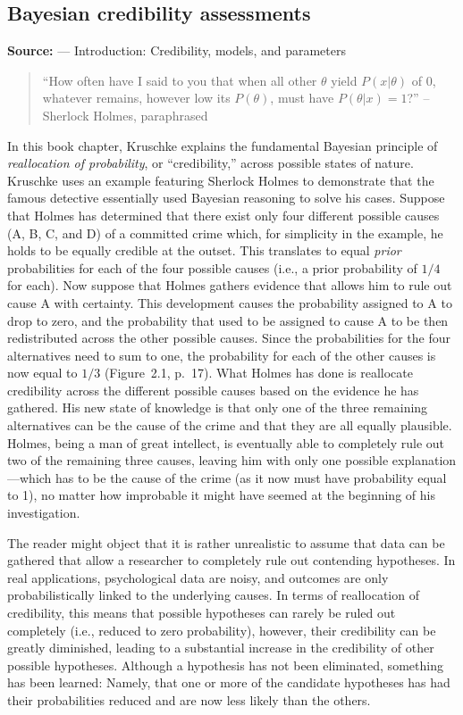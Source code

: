 \subsection{Bayesian credibility assessments}
\noindent\textbf{Source:}  --- Introduction: Credibility, models, and parameters

\vspace{2mm}
\begin{quote}
``How often have I said to you that when all other $\theta$ yield $P(x|\theta)$ of $0$, whatever remains, however low its $P(\theta)$, must have $P(\theta|x) = 1$?''
\flushright -- Sherlock Holmes, paraphrased
\end{quote} 
In this book chapter, Kruschke explains the fundamental Bayesian principle of \emph{reallocation of probability}, or ``credibility,'' across possible states of nature. Kruschke uses an example featuring Sherlock Holmes to demonstrate that the famous detective essentially used Bayesian reasoning to solve his cases.
Suppose that Holmes has determined that there exist only four different possible causes (A, B, C, and D) of a committed crime which, for simplicity in the example, he holds to be equally credible at the outset.
This translates to equal \textit{prior} probabilities for each of the four possible causes (i.e., a prior probability of $1/4$ for each).
Now suppose that Holmes gathers evidence that allows him to rule out cause A with certainty.  This development causes the probability assigned to A to drop to zero, and the probability that used to be assigned to cause A to be then redistributed across the other possible causes. Since the probabilities for the four alternatives need to sum to one, the probability for each of the other causes is now equal to $1/3$ (Figure~2.1, p.~17).
What Holmes has done is reallocate credibility across the different possible causes based on the evidence he has gathered.
His new state of knowledge is that only one of the three remaining alternatives can be the cause of the crime and that they are all equally plausible.
Holmes, being a man of great intellect, is eventually able to completely rule out two of the remaining three causes, leaving him with only one possible explanation---which has to be the cause of the crime (as it now must have probability equal to 1), no matter how improbable it might have seemed at the beginning of his investigation.

The reader might object that it is rather unrealistic to assume that data can be gathered that allow a researcher to completely rule out contending hypotheses.
In real applications, psychological data are noisy, and outcomes are only probabilistically linked to the underlying causes.
In terms of reallocation of credibility, this means that possible hypotheses can rarely be ruled out completely (i.e., reduced to zero probability), however, their credibility can be greatly diminished, leading to a substantial increase in the credibility of other possible hypotheses.
Although a hypothesis has not been eliminated, something has been learned: Namely, that one or more of the candidate hypotheses has had their probabilities reduced and are now less likely than the others.

